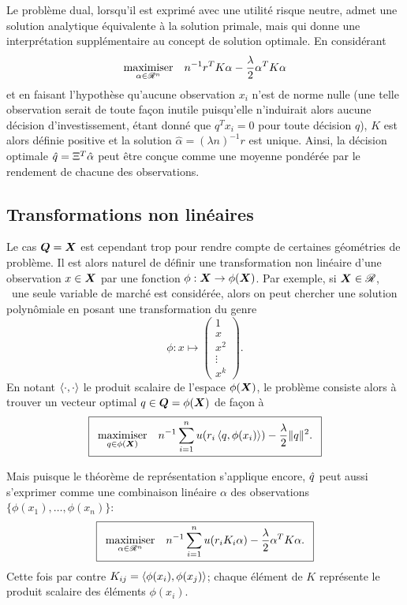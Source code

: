 Le problème dual, lorsqu'il est exprimé avec une utilité risque neutre, admet une solution
analytique équivalente à la solution primale, mais qui donne une interprétation
supplémentaire au concept de solution optimale. En considérant
\begin{equation}
  \maximizeEquation[\alpha \in \Re^n]{n^{-1}r^TK\alpha - \frac{\lambda}{2}\alpha^TK\alpha}
\end{equation}
et en faisant l'hypothèse qu'aucune observation $x_i$ n'est de norme nulle (une telle
observation serait de toute façon inutile puisqu'elle n'induirait alors aucune décision
d'investissement, étant donné que $q^Tx_i=0$ pour toute décision $q$), $K$ est alors
définie positive et la solution $\hat\alpha = (\lambda n)^{-1}r$ est unique. Ainsi, la décision
optimale $\qh = \Xi^T\hat \alpha$ peut être conçue comme une moyenne pondérée par le rendement de
chacune des observations.


\subsection{Transformations non linéaires}


Le cas $\Q = \X$ est cependant trop pour rendre compte de certaines géométries de
problème. Il est alors naturel de définir une transformation non linéaire d'une
observation $x \in \X$ par une fonction $\phi:\X\to\phi(\X)$. Par exemple, si
$\X \in \Re$, \ie\ une seule variable de marché est considérée, alors on peut chercher une
solution polynômiale en posant une transformation du genre
\begin{equation}
  \phi:x \mapsto
  \begin{pmatrix}
    1 \\ x \\ x^2 \\ \vdots \\ x^k
  \end{pmatrix}.
\end{equation}
En notant $\inp{\cdot,\cdot}$ le produit scalaire de l'espace $\phi(\X)$, le problème consiste alors
à trouver un vecteur optimal $q \in \Q = \phi(\X)$ de façon à
{\begin{equation}
    \boxed{
      \maximizeEquation[q\in\phi(\X)]{n^{-1}\sumi u(r_i\,\inp{q,\phi(x_i)}) - \frac{\lambda}{2}\|q\|^2.}}
  \end{equation}
  \vspace{-\baselineskip}}

Mais puisque le théorème de représentation s'applique encore, $\qh$ peut aussi s'exprimer
comme une combinaison linéaire $\alpha$ des observations $\{\phi(x_1) ,\ldots, \phi(x_n)\}$:
{\begin{equation}
\boxed{
  \maximizeEquation[\alpha \in \Re^n]{n^{-1}\sumi u(r_iK_i\alpha) - \frac{\lambda}{2}\alpha^TK\alpha.}}
\end{equation}
\vspace{-\baselineskip}}
Cette fois par contre $K_{ij} = \inp{\phi(x_i),\phi(x_j)}$; chaque élément de $K$ représente le
produit scalaire des éléments $\phi(x_i)$.



